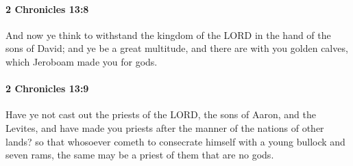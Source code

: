 		\paragraph{2 Chronicles 13:8} %
			\label{2CHRONICLES-13-8}

			And now ye think to withstand the kingdom of the LORD in the hand of the sons of David; and ye be a great multitude, and there are with you golden calves, which Jeroboam made you for gods.


		\paragraph{2 Chronicles 13:9} %
			\label{2CHRONICLES-13-9}

			Have ye not cast out the priests of the LORD, the sons of Aaron, and the Levites, and have made you priests after the manner of the nations of other lands? so that whosoever cometh to consecrate himself with a young bullock and seven rams, the same may be a priest of them that are no gods.


